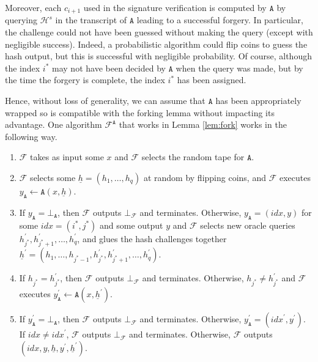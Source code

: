 \documentclass{article}
\theoremstyle{plain}
\theoremstyle{definition}
\begin{document}
Moreover, each $c_{i+1}$ used in the signature verification is computed by $\texttt{A}$ by querying $\mathcal{H}^s$  in the transcript of $\texttt{A}$ leading to a successful forgery. In particular, the challenge could not have been guessed without making the query (except with negligible success). Indeed, a probabilistic algorithm could flip coins to guess the hash output, but this is successful with negligible probability. Of course, although the index $i^*$ may not have been decided by $\texttt{A}$ when the query was made, but by the time the forgery is complete, the index $i^*$ has been assigned.

Hence, without loss of generality, we can assume that $\texttt{A}$ has been appropriately wrapped so is compatible with the forking lemma without impacting its advantage. One algorithm $\mathcal{F}^\texttt{A}$ that works in Lemma \ref{lem:fork} works in the following way.

\begin{enumerate}
\item $\mathcal{F}$ takes as input some $x$ and $\mathcal{F}$ selects the random tape for $\texttt{A}$.
\item $\mathcal{F}$ selects some $\underline{h} = (h_1, \ldots, h_q)$ at random by flipping coins, and $\mathcal{F}$ executes $y_\texttt{A} \leftarrow \texttt{A}(x,\underline{h})$.
\item If $y_{\texttt{A}} = \bot_{\texttt{A}}$, then $\mathcal{F}$ outputs $\bot_{\mathcal{F}}$ and terminates. Otherwise, $y_{\texttt{A}} = (\textit{idx}, y)$ for some $\textit{idx}=(i^*,j^*)$ and some output $y$ and $\mathcal{F}$ selects new oracle queries $h_{j^*}^\prime, h_{j^*+1}^\prime, \ldots, h_q^\prime$, and glues the hash challenges together $\underline{h}^\prime = (h_1, \ldots, h_{j^*-1}, h_{j^*}^\prime, h_{j^*+1}^\prime, \ldots, h_q^\prime)$. 
\item If $h_{j^*} = h_{j^{*}}^\prime$, then $\mathcal{F}$ outputs $\bot_{\mathcal{F}}$ and terminates. Otherwise, $h_{j^*} \neq h_{j^{*}}^\prime$ and $\mathcal{F}$ executes $y_\texttt{A}^\prime \leftarrow \texttt{A}(x,\underline{h}^\prime)$.
\item If $y_{\texttt{A}}^\prime = \bot_{\texttt{A}}$, then $\mathcal{F}$ outputs $\bot_{\mathcal{F}}$ and terminates. Otherwise, $y_{\texttt{A}}^\prime = (\textit{idx}^{\prime}, y^\prime)$. If $\textit{idx} \neq \textit{idx}^\prime$, $\mathcal{F}$ outputs $\bot_{\mathcal{F}}$ and terminates. Otherwise, $\mathcal{F}$ outputs $(\textit{idx}, y, \underline{h}, y^\prime, \underline{h}^\prime)$.
\end{enumerate}
\end{document}
